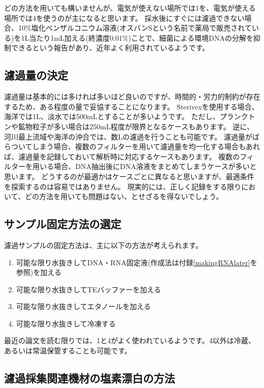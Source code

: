 \documentclass[titlepage,10pt,a4paper,uplatex]{jsbook}
\begin{document}
どの方法を用いても構いませんが、電気が使えない場所では1を、電気が使える場所では4を使うのが主になると思います。
採水後にすぐには濾過できない場合、10\%塩化ベンザルコニウム溶液(オスバンSという名前で薬局で販売されている)を1L当たり1mL加える(終濃度0.01\%)ことで、細菌による環境DNAの分解を抑制できるという報告\citep{Yamanaka2017}があり、近年よく利用されているようです。

\subsection{濾過量の決定}

濾過量は基本的には多ければ多いほど良いのですが、時間的・労力的制約が存在するため、ある程度の量で妥協することになります。
Sterivexを使用する場合、海洋では1L、淡水では500mLとすることが多いようです。
ただし、プランクトンや鉱物粒子が多い場合は250mL程度が限界となるケースもあります。
逆に、河川最上流域や海洋の沖合では、数Lの濾過を行うことも可能です。
濾過量がばらついてしまう場合、複数のフィルターを用いて濾過量を均一化する場合もあれば、濾過量を記録しておいて解析時に対応するケースもあります。
複数のフィルターを用いる場合、DNA抽出後にDNA溶液をまとめてしまうケースが多いと思います。
どうするのが最適かはケースごとに異なると思いますが、最適条件を探索するのは容易ではありません。
現実的には、正しく記録をする限りにおいて、どの方法を用いても問題はない、とせざるを得ないでしょう。

\subsection{サンプル固定方法の選定}

濾過サンプルの固定方法は、主に以下の方法が考えられます。

\begin{enumerate}
\item 可能な限り水抜きしてDNA・RNA固定液(作成法は付録\ref{makingRNAlater}を参照)を加える
\item 可能な限り水抜きしてTEバッファーを加える
\item 可能な限り水抜きしてエタノールを加える
\item 可能な限り水抜きして冷凍する
\end{enumerate}

最近の論文を読む限りでは、1と4がよく使われているようです。4以外は冷蔵、あるいは常温保管することも可能です。

\subsection{濾過採集関連機材の塩素漂白の方法}
\end{document}
